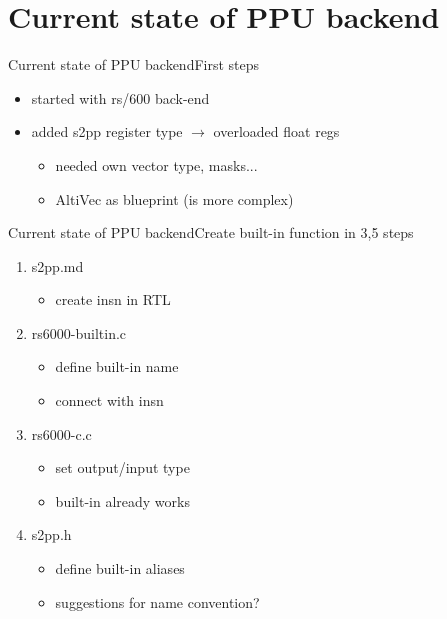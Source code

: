 \documentclass[10pt]{beamer}
\begin{document}
\section{Current state of PPU backend}
\begin{frame}{Current state of PPU backend}{First steps}
	\begin{itemize}
		\item started with rs/600 back-end
		\item added s2pp register type $\rightarrow$ overloaded float regs
			\begin{itemize}
				\item needed own vector type, masks...
				\item AltiVec as blueprint (is more complex)
			\end{itemize}
	\end{itemize}
\end{frame}

\begin{frame}{Current state of PPU backend}{Create built-in function in 3,5 steps}
	\begin{enumerate}
		\item s2pp.md
		\begin{itemize}
			\item create insn in RTL
		\end{itemize}
		\item rs6000-builtin.c
		\begin{itemize}
			\item define built-in name
			\item connect with insn
		\end{itemize}
		\item rs6000-c.c
		\begin{itemize}
			\item set output/input type
			\item built-in already works
		\end{itemize}
		\item s2pp.h
		\begin{itemize}
			\item define built-in aliases
			\item suggestions for name convention?
		\end{itemize}
	\end{enumerate}
\end{frame}
\end{document}
